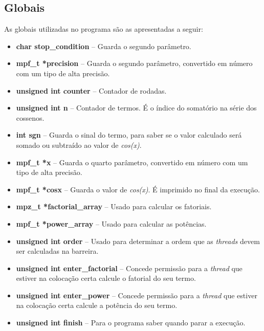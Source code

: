\documentclass[11pt]{article}
\begin{document}
\subsection{Globais}
As globais utilizadas no programa são as apresentadas a seguir:
\begin{itemize}
	\item \textbf{\textcolor{sblue}{char} stop\_condition} -- Guarda o segundo parâmetro.
	\item \textbf{\textcolor{sblue}{mpf\_t} *precision} -- Guarda o segundo parâmetro, convertido em número com um tipo de alta precisão.
	\item \textbf{\textcolor{sblue}{unsigned int} counter} -- Contador de rodadas.
	\item \textbf{\textcolor{sblue}{unsigned int} n} -- Contador de termos. É o índice do somatório na série dos cossenos.
	\item \textbf{\textcolor{sblue}{int} sgn} -- Guarda o sinal do termo, para saber se o valor calculado será somado ou subtraído ao valor de \textit{cos(x)}.
	\item \textbf{\textcolor{sblue}{mpf\_t} *x} -- Guarda o quarto parâmetro, convertido em número com um tipo de alta precisão.
	\item \textbf{\textcolor{sblue}{mpf\_t} *cosx} -- Guarda o valor de \textit{cos(x)}. É imprimido no final da execução.
	\item \textbf{\textcolor{sblue}{mpz\_t} *factorial\_array} -- Usado para calcular os fatoriais.
	\item \textbf{\textcolor{sblue}{mpf\_t} *power\_array} -- Usado para calcular as potências.
	\item \textbf{\textcolor{sblue}{unsigned int} order} -- Usado para determinar a ordem que as \textit{threads} devem ser calculadas na barreira.
	\item \textbf{\textcolor{sblue}{unsigned int} enter\_factorial} -- Concede permissão para a \textit{thread} que estiver na colocação certa calcule o fatorial do seu termo.
	\item \textbf{\textcolor{sblue}{unsigned int} enter\_power} -- Concede permissão para a \textit{thread} que estiver na colocação certa calcule a potência do seu termo.
	\item \textbf{\textcolor{sblue}{unsigned int} finish} -- Para o programa saber quando parar a execução.
\end{itemize}
\end{document}
